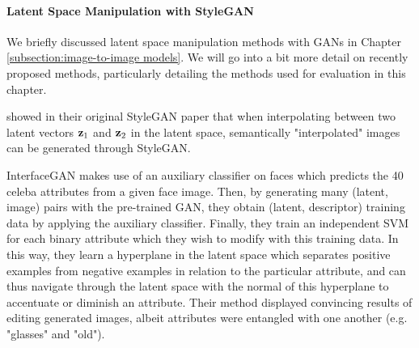 
\paragraph{Latent Space Manipulation with StyleGAN}
We briefly discussed latent space manipulation methods with \ac{GAN}s in 
Chapter \ref{subsection:image-to-image models}. We will go into a bit more detail 
on recently proposed methods, particularly detailing the methods used for evaluation 
in this chapter.

\cite{karra2019stylegan} showed in their original StyleGAN paper that 
when interpolating between two latent vectors $\mathbf{z}_1$ and $\mathbf{z}_2$ in the 
latent space, semantically "interpolated" images can be generated through
StyleGAN.

InterfaceGAN \citep{shen2020} makes use of an auxiliary classifier on faces which predicts 
the 40 celeba \citep{celeba} attributes from a given face image. 
Then, by generating many (latent, image) pairs with the pre-trained \ac{GAN},
they obtain (latent, descriptor) training data by applying the auxiliary 
classifier. Finally, they train an independent SVM \citep{svms} for each 
binary attribute which they wish to modify with this training data. In this way,
they learn a hyperplane in the latent space which separates positive examples 
from negative examples in relation to the particular attribute, and can thus 
navigate through the latent space with the normal of this hyperplane to 
accentuate or diminish an attribute. Their method displayed convincing results 
of editing generated images, albeit attributes were entangled with one 
another (e.g. "glasses" and "old").

